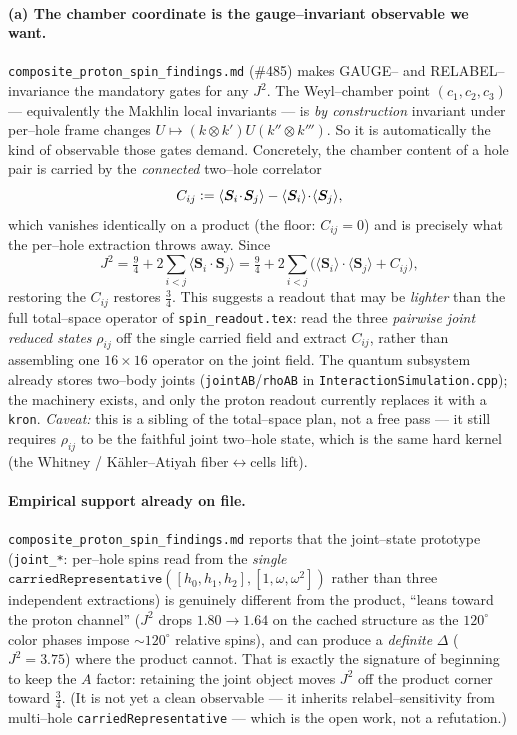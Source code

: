 \documentclass[11pt,oneside]{article}
\newcommand{\eqdef}{\vcentcolon=}
\newcommand{\expval}[1]{\langle #1 \rangle}
\newcommand{\code}[1]{\texttt{#1}}
\theoremstyle{plain}
\begin{document}
\paragraph{(a) The chamber coordinate is the gauge--invariant observable we want.}
\code{composite\_proton\_spin\_findings.md} (\#485) makes GAUGE-- and
RELABEL--invariance the mandatory gates for any $J^2$. The Weyl--chamber point
$(c_1,c_2,c_3)$ --- equivalently the Makhlin local invariants \cite{makhlin} --- is
\emph{by construction} invariant under per--hole frame changes
$U\mapsto(k\otimes k')U(k''\otimes k''')$. So it is automatically the kind of
observable those gates demand. Concretely, the chamber content of a hole pair is
carried by the \emph{connected} two--hole correlator
\begin{equation}
  C_{ij} \eqdef \expval{\bm S_i\!\cdot\!\bm S_j}
              - \expval{\bm S_i}\!\cdot\!\expval{\bm S_j},
  \label{eq:Cij}
\end{equation}
which vanishes identically on a product (the floor: $C_{ij}=0$) and is precisely
what the per--hole extraction throws away. Since
\begin{equation}
  J^2 = \tfrac94 + 2\!\sum_{i<j}\expval{\bm S_i\!\cdot\!\bm S_j}
      = \tfrac94 + 2\!\sum_{i<j}\big(\expval{\bm S_i}\!\cdot\!\expval{\bm S_j}+C_{ij}\big),
\end{equation}
restoring the $C_{ij}$ restores $\tfrac34$. This suggests a readout that may be
\emph{lighter} than the full total--space operator of \code{spin\_readout.tex}:
read the three \emph{pairwise joint reduced states} $\rho_{ij}$ off the single
carried field and extract $C_{ij}$, rather than assembling one $16\times16$ operator
on the joint field. The quantum subsystem already stores two--body joints
(\code{jointAB}/\code{rhoAB} in \code{InteractionSimulation.cpp}); the machinery
exists, and only the proton readout currently replaces it with a \code{kron}.
\emph{Caveat:} this is a sibling of the total--space plan, not a free pass --- it
still requires $\rho_{ij}$ to be the faithful joint two--hole state, which is the
same hard kernel (the Whitney / K\"ahler--Atiyah fiber$\leftrightarrow$cells lift).

\paragraph{Empirical support already on file.}
\code{composite\_proton\_spin\_findings.md} reports that the joint--state prototype
(\code{joint\_*}: per--hole spins read from the \emph{single}
$\code{carriedRepresentative}([h_0,h_1,h_2],[1,\omega,\omega^2])$ rather than three
independent extractions) is genuinely different from the product, ``leans toward
the proton channel'' ($J^2$ drops $1.80\!\to\!1.64$ on the cached structure as the
$120^\circ$ color phases impose ${\sim}120^\circ$ relative spins), and can produce
a \emph{definite} $\Delta$ ($J^2=3.75$) where the product cannot. That is exactly
the signature of beginning to keep the $A$ factor: retaining the joint object moves
$J^2$ off the product corner toward $\tfrac34$. (It is not yet a clean observable
--- it inherits relabel--sensitivity from multi--hole
\code{carriedRepresentative} --- which is the open work, not a refutation.)
\end{document}
